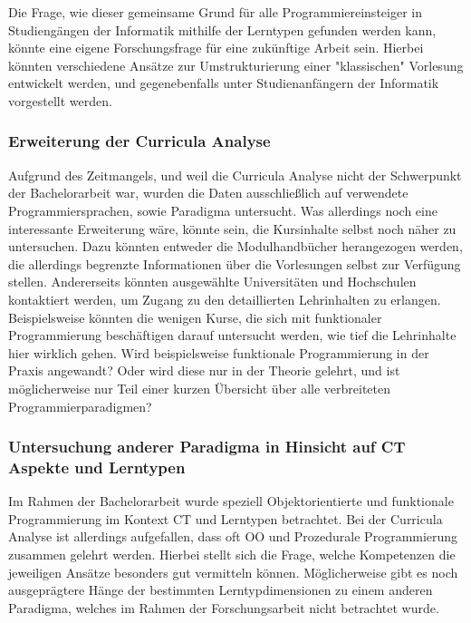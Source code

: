 Die Frage, wie dieser gemeinsame Grund für alle Programmiereinsteiger in Studiengängen der Informatik mithilfe der Lerntypen gefunden werden kann, könnte eine eigene Forschungsfrage für eine zukünftige Arbeit sein. Hierbei könnten verschiedene Ansätze zur Umstrukturierung einer "klassischen" Vorlesung entwickelt werden, und gegenebenfalls unter Studienanfängern der Informatik vorgestellt werden.

\subsubsection{Erweiterung der Curricula Analyse}
Aufgrund des Zeitmangels, und weil die Curricula Analyse nicht der Schwerpunkt der Bachelorarbeit war, wurden die Daten ausschließlich auf verwendete Programmiersprachen, sowie Paradigma untersucht. Was allerdings noch eine interessante Erweiterung wäre, könnte sein, die Kursinhalte selbst noch näher zu untersuchen. Dazu könnten entweder die Modulhandbücher herangezogen werden, die allerdings begrenzte Informationen über die Vorlesungen selbst zur Verfügung stellen. Andererseits könnten ausgewählte Universitäten und Hochschulen kontaktiert werden, um Zugang zu den detaillierten Lehrinhalten zu erlangen.
Beispielsweise könnten die wenigen Kurse, die sich mit funktionaler Programmierung beschäftigen darauf untersucht werden, wie tief die Lehrinhalte hier wirklich gehen. Wird beispielsweise funktionale Programmierung in der Praxis angewandt? Oder wird diese nur in der Theorie gelehrt, und ist möglicherweise nur Teil einer kurzen Übersicht über alle verbreiteten Programmierparadigmen?

\subsubsection{Untersuchung anderer Paradigma in Hinsicht auf CT Aspekte und Lerntypen}
Im Rahmen der Bachelorarbeit wurde speziell Objektorientierte und funktionale Programmierung im Kontext CT und Lerntypen betrachtet. Bei der Curricula Analyse ist allerdings aufgefallen, dass oft OO und Prozedurale Programmierung zusammen gelehrt werden. Hierbei stellt sich die Frage, welche Kompetenzen die jeweiligen Ansätze besonders gut vermitteln können.
Möglicherweise gibt es noch ausgeprägtere Hänge der bestimmten Lerntypdimensionen zu einem anderen Paradigma, welches im Rahmen der Forschungsarbeit nicht betrachtet wurde.

